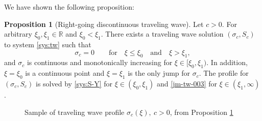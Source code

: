 \documentclass[12pt]{article}
\theoremstyle{definition}
\newtheorem{proposition}[theorem]{Proposition}
\theoremstyle{remark}
\numberwithin{equation}{section}
\begin{document}
We have shown the following proposition:
\begin{proposition}[Right-going discontinuous traveling wave]\label{prop:rg-jump-tw} Let $ c > 0 $. For arbitrary $ \xi_0, \xi_1 \in \mathbb R $ and $ \xi_0 < \xi_1 $. There exists a traveling wave solution $ (\sigma_c, S_c) $ to system \eqref{sys:tw} such that 
\begin{equation}
    \label{tw-discontinuous}
    \sigma_c = 0 \qquad \text{for} \quad \xi \leq \xi_0 \quad \text{and} \quad \xi > \xi_1,
\end{equation}
and $ \sigma_c $ is continuous and monotonically increasing for $ \xi \in [\xi_0,\xi_1) $. In addition, $ \xi = \xi_0 $ is a continuous point and $ \xi = \xi_1 $ is the only jump for $ \sigma_c $. The profile for $(\sigma_c,S_c)$ is solved by \eqref{sys:S-Y} for $ \xi \in (\xi_0,\xi_1) $ and \eqref{jm-tw-003} for $ \xi \in (\xi_1,\infty) $. 
\end{proposition}

\begin{figure}[htbp]
\centering
{}
\caption{Sample of traveling wave profile $\sigma_c(\xi), \ c > 0 $, from Proposition \ref{prop:rg-jump-tw}}
\label{fig:sigma_c_traveling_rg-jump}
\end{figure}
\end{document}
